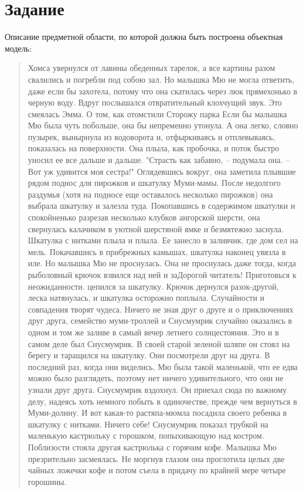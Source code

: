 \documentclass[11pt,a4paper]{article}
\begin{document}
	\section{Задание}
		Описание предметной области, по которой должна быть построена объектная модель:
		\begin{quote}
			Хомса увернулся от лавины обеденных тарелок, а все картины разом свалились и погребли под собою зал. Но малышка Мю не могла ответить, даже если бы захотела, потому что она скатилась через люк прямехонько в черную воду. Вдруг послышался отвратительный клохчущий звук. Это смеялась Эмма. О том, как отомстили Сторожу парка Если бы малышка Мю была чуть побольше, она бы непременно утонула. А она легко, словно пузырек, вынырнула из водоворота и, отфыркиваясь и отплевываясь, показалась на поверхности. Она плыла, как пробочка, и поток быстро уносил ее все дальше и дальше. "Страсть как забавно, -- подумала она. -- Вот уж удивится моя сестра!" Оглядевшись вокруг, она заметила плывшие рядом поднос для пирожков и шкатулку Муми-мамы. После недолгого раздумья (хотя на подносе еще оставалось несколько пирожков) она выбрала шкатулку и залезла туда. Покопавшись в содержимом шкатулки и спокойненько разрезав несколько клубков ангорской шерсти, она свернулась калачиком в уютной шерстяной ямке и безмятежно заснула. Шкатулка с нитками плыла и плыла. Ее занесло в заливчик, где дом сел на мель. Покачавшись в прибрежных камышах, шкатулка наконец увязла в иле. Но малышка Мю не проснулась. Она не проснулась даже тогда, когда рыболовный крючок взвился над ней и заДорогой читатель! Приготовься к неожиданности. цепился за шкатулку. Крючок дернулся разок-другой, леска натянулась, и шкатулка осторожно поплыла. Случайности и совпадения творят чудеса. Ничего не зная друг о друге и о приключениях друг друга, семейство муми-троллей и Снусмумрик случайно оказались в одном и том же заливе в самый вечер летнего солнцестояния. Это и в самом деле был Снусмумрик. В своей старой зеленой шляпе он стоял на берегу и таращился на шкатулку. Они посмотрели друг на друга. В последний раз, когда они виделись, Мю была такой маленькой, что ее едва можно было разглядеть, поэтому нет ничего удивительного, что они не узнали друг друга. Снусмумрик вздохнул. Он приехал сюда по важному делу, надеясь хоть немного побыть в одиночестве, прежде чем вернуться в Муми-долину. И вот какая-то растяпа-мюмла посадила своего ребенка в шкатулку с нитками. Ничего себе! Снусмумрик показал трубкой на маленькую кастрюльку с горошком, попыхивающую над костром. Поблизости стояла другая кастрюлька с горячим кофе. Малышка Мю презрительно засмеялась. Не моргнув глазом она проглотила целых две чайных ложечки кофе и потом съела в придачу по крайней мере четыре горошины.
		\end{quote}
	
\end{document}
